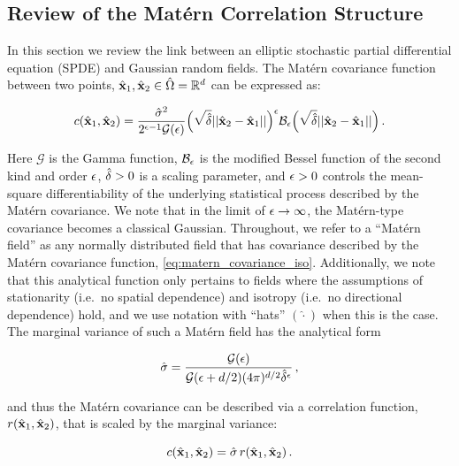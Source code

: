 \subsection{Review of the Mat\'ern Correlation Structure}
\label{ssec:matern_review}

In this section we review the link between an elliptic stochastic partial
differential equation (SPDE) and Gaussian random fields.
The Mat\'ern covariance function between two points, $\hat{\mathbf{x}}_1,\hat{\mathbf{x}}_2\in\hat{\Omega} =
\mathbb{R}^{d}$ can be expressed as:
\begin{linenomath*}\begin{equation}
    c(\hat{\mathbf{x}}_1,\hat{\mathbf{x}}_2) = \dfrac{\hat{\sigma}^2}{2^{\epsilon-1}
    \mathcal{G}(\epsilon)}
    \Big(\sqrt{\hat{\delta}} ||\hat{\mathbf{x}}_2-\hat{\mathbf{x}}_1||\Big)^{\epsilon}
    \mathcal{B}_{\epsilon}
    \Big(\sqrt{\hat{\delta}} ||\hat{\mathbf{x}}_2-\hat{\mathbf{x}}_1||\Big) \, .
    \label{eq:matern_covariance_iso}
\end{equation}\end{linenomath*}
Here
$\mathcal{G}$ is the Gamma function,
$\mathcal{B}_{\epsilon}$ is the modified
Bessel function of the second kind and order $\epsilon$,
$\hat{\delta}>0$ is a scaling parameter, and $\epsilon>0$
controls the mean-square differentiability of the underlying statistical process
described by the Mat\'ern covariance.
We note that in the limit of $\epsilon\rightarrow\infty$, the Mat\'ern-type
covariance becomes a classical Gaussian.
Throughout, we refer to a ``Mat\'ern field'' as any normally distributed field that has
covariance described by the Mat\'ern covariance function,
\cref{eq:matern_covariance_iso}.
Additionally, we note that this analytical function only pertains to fields where the
assumptions of stationarity (i.e.\ no spatial dependence) and isotropy (i.e.\ no
directional dependence) hold, and we use notation with ``hats'' $(\hat{\cdot})$
when this is the case.
The marginal variance of such a Mat\'ern field has the analytical form
\begin{linenomath*}\begin{equation}
    \hat{\sigma} = \dfrac{\mathcal{G}(\epsilon)}{
        \mathcal{G}(\epsilon + d/2)(4\pi)^{d/2}
        \hat{\delta}^{\epsilon}
    } \, ,
    \label{eq:matern_variance}
\end{equation}\end{linenomath*}
and thus the Mat\'ern covariance can be described via a correlation
function, $r(\hat{\mathbf{x}}_1, \hat{\mathbf{x}}_2)$, that is scaled by the marginal variance:
\begin{linenomath*}\begin{equation}
    c(\hat{\mathbf{x}}_1, \hat{\mathbf{x}}_2) = \hat{\sigma}\,r(\hat{\mathbf{x}}_1, \hat{\mathbf{x}}_2) \, .
\end{equation}\end{linenomath*}

